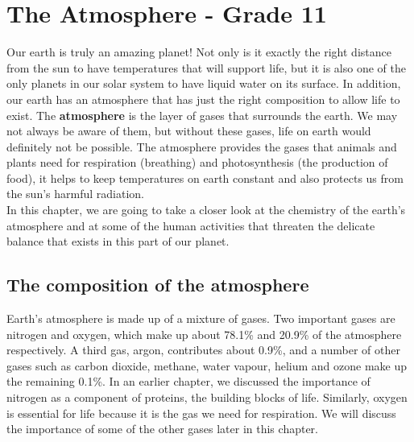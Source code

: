 
\chapter{The Atmosphere - Grade 11}
\label{chap:atmosphere}

Our earth is truly an amazing planet! Not only is it exactly the right distance from the sun to have temperatures that will support life, but it is also one of the only planets in our solar system to have liquid water on its surface. In addition, our earth has an atmosphere that has just the right composition to allow life to exist. The \textbf{atmosphere} is the layer of gases that surrounds the earth. We may not always be aware of them, but without these gases, life on earth would definitely not be possible. The atmosphere provides the gases that animals and plants need for respiration (breathing) and photosynthesis (the production of food), it helps to keep temperatures on earth constant and also protects us from the sun's harmful radiation. \\ 

In this chapter, we are going to take a closer look at the chemistry of the earth's atmosphere and at some of the human activities that threaten the delicate balance that exists in this part of our planet.

\section{The composition of the atmosphere}
\label{sec:atmos:comp}

Earth's atmosphere is made up of a mixture of gases. Two important gases are nitrogen and oxygen, which make up about 78.1\% and 20.9\% of the atmosphere respectively. A third gas, argon, contributes about 0.9\%, and a number of other gases such as carbon dioxide, methane, water vapour, helium and ozone make up the remaining 0.1\%. In an earlier chapter, we discussed the importance of nitrogen as a component of proteins, the building blocks of life. Similarly, oxygen is essential for life because it is the gas we need for respiration. We will discuss the importance of some of the other gases later in this chapter.


